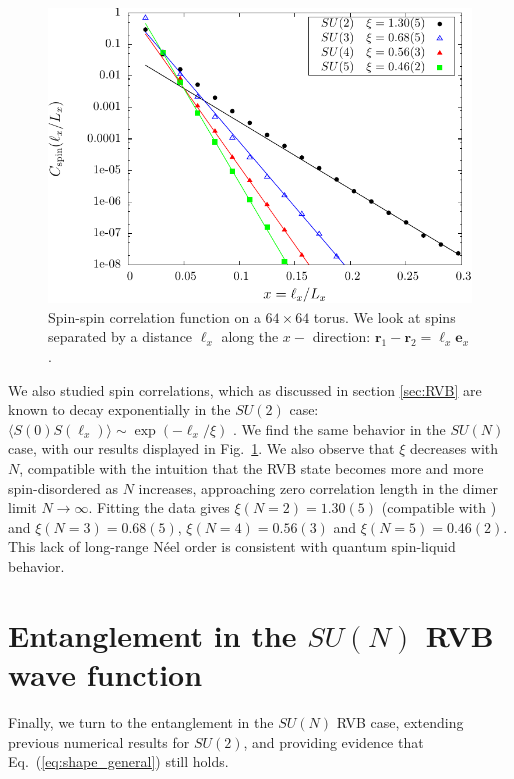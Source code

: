 \documentclass[11pt]{iopart}
\begin{document}
\begin{figure}[ht]
 \begin{center}
  \includegraphics[scale=0.8]{./figures/spin_corr.pdf}
 \end{center}
\caption{Spin-spin correlation function on a $64\times 64$ torus. We look at spins separated by a distance $\ell_x$ along the $x-$ direction:  $\mathbf{r}_1-\mathbf{r}_2=\ell_x \mathbf{e}_x$. }
\label{fig:corrspin_su2}
\end{figure}
We also studied spin correlations, which as discussed in section \ref{sec:RVB} are known to decay exponentially in the $SU(2)$ case: 
$
 \langle S(0)S(\ell_x) \rangle \sim \exp \left(-{\ell_x}/{\xi}\right)
$ \cite{LDA,RVB1}.
We find the same behavior in the $SU(N)$ case, with our results displayed in Fig.~\ref{fig:corrspin_su2}. We also observe that $\xi$ decreases with $N$, compatible with the intuition that the RVB state becomes more and more spin-disordered as $N$ increases, approaching zero correlation length in the dimer limit $N\to\infty$. Fitting the data gives  $\xi(N=2)=1.30(5)$ (compatible with \cite{RVB1}) and $\xi(N=3)=0.68(5)$, $\xi(N=4)=0.56(3)$ and $\xi(N=5)=0.46(2)$. This lack of long-range N\'eel order is consistent with quantum spin-liquid  behavior. 




\section{Entanglement in the $SU(N)$ RVB wave function}
\label{sec:rvb_entanglement}

Finally, we turn to the entanglement in the $SU(N)$ RVB case, extending previous numerical results \cite{Ju2012} for $SU(2)$, and providing evidence that Eq.~(\ref{eq:shape_general}) still holds.
\end{document}
